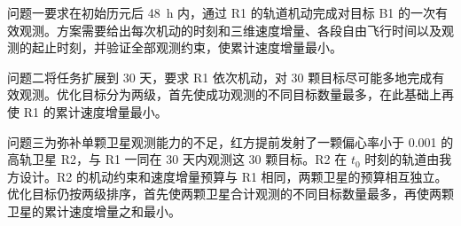 {\heiti 问题一}\quad 要求在初始历元后 48~h 内，通过 R1 的轨道机动完成对目标 B1 的一次有效观测。方案需要给出每次机动的时刻和三维速度增量、各段自由飞行时间以及观测的起止时刻，并验证全部观测约束，使累计速度增量最小。

{\heiti 问题二}\quad 将任务扩展到 30 天，要求 R1 依次机动，对 30 颗目标尽可能多地完成有效观测。优化目标分为两级，首先使成功观测的不同目标数量最多，在此基础上再使 R1 的累计速度增量最小。

{\heiti 问题三}\quad 为弥补单颗卫星观测能力的不足，红方提前发射了一颗偏心率小于 0.001 的高轨卫星 R2，与 R1 一同在 30 天内观测这 30 颗目标。R2 在 $t_0$ 时刻的轨道由我方设计。R2 的机动约束和速度增量预算与 R1 相同，两颗卫星的预算相互独立。优化目标仍按两级排序，首先使两颗卫星合计观测的不同目标数量最多，再使两颗卫星的累计速度增量之和最小。
